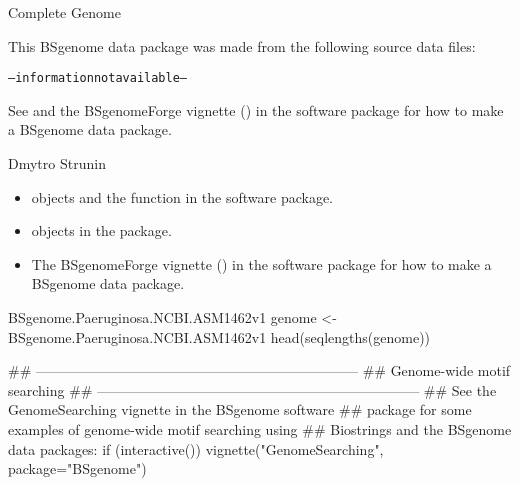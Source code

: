 \documentclass[letterpaper]{book}
\begin{document}
%
\begin{Description}\relax
Complete Genome
\end{Description}
%
\begin{Note}\relax
This BSgenome data package was made from the following source data files:
\begin{alltt}
-- information not available --
  \end{alltt}


See  and the BSgenomeForge
vignette () in the 
software package for how to make a BSgenome data package.
\end{Note}
%
\begin{Author}\relax
Dmytro Strunin
\end{Author}
%
\begin{SeeAlso}\relax
\begin{itemize}

\item{}  objects and the
 function
in the  software package.
\item{}  objects in the 
package.
\item{} The BSgenomeForge vignette ()
in the  software package for how to make a BSgenome
data package.

\end{itemize}

\end{SeeAlso}
%
\begin{Examples}
\begin{ExampleCode}
BSgenome.Paeruginosa.NCBI.ASM1462v1
genome <- BSgenome.Paeruginosa.NCBI.ASM1462v1
head(seqlengths(genome))


## ---------------------------------------------------------------------
## Genome-wide motif searching
## ---------------------------------------------------------------------
## See the GenomeSearching vignette in the BSgenome software
## package for some examples of genome-wide motif searching using
## Biostrings and the BSgenome data packages:
if (interactive())
    vignette("GenomeSearching", package="BSgenome")
\end{ExampleCode}
\end{Examples}
\printindex{}
\end{document}
